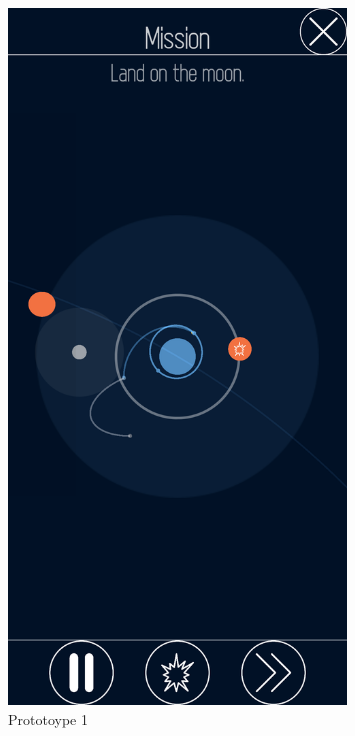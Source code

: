 \documentclass[runningheads]{llncs}
\begin{document}
\begin{figure}[!htb]
  \centering
  \begin{minipage}{.5\textwidth}
      \centering
      \includegraphics[width=0.8\textwidth]{Prototype1.png}
      \caption{Prototoype 1}
      \label{fig:prot1}
  \end{minipage}%
  \begin{minipage}{0.5\textwidth}
      \centering

\end{minipage}
\end{figure}
\end{document}
